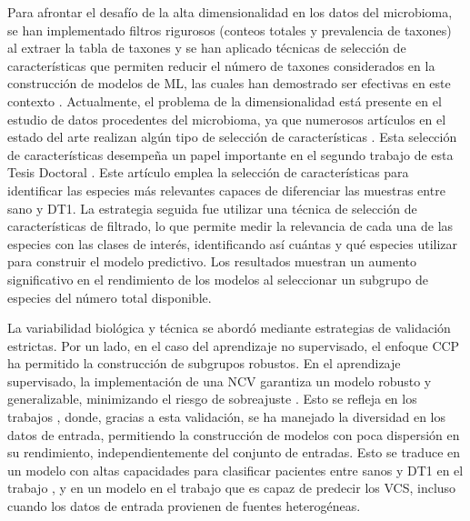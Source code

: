 Para afrontar el desafío de la alta dimensionalidad en los datos del microbioma, se han implementado filtros rigurosos (conteos totales y prevalencia de taxones) al extraer la tabla de taxones y se han aplicado técnicas de selección de características que permiten reducir el número de taxones considerados en la construcción de modelos de ML, las cuales han demostrado ser efectivas en este contexto \cite{segata2011metagenomic}. Actualmente, el problema de la dimensionalidad está presente en el estudio de datos procedentes del microbioma, ya que numerosos artículos en el estado del arte realizan algún tipo de selección de características \cite{beck2015machine, biassoni2020gut, bakir2021discovering, bakir2022inflammatory, chavarria2025using}. Esta selección de características desempeña un papel importante en el segundo trabajo de esta Tesis Doctoral \cite{paper2}. Este artículo emplea la selección de características para identificar las especies más relevantes capaces de diferenciar las muestras entre sano y DT1. La estrategia seguida fue utilizar una técnica de selección de características de filtrado, lo que permite medir la relevancia de cada una de las especies con las clases de interés, identificando así cuántas y qué especies utilizar para construir el modelo predictivo. Los resultados muestran un aumento significativo en el rendimiento de los modelos al seleccionar un subgrupo de especies del número total disponible.


La variabilidad biológica y técnica se abordó mediante estrategias de validación estrictas. Por un lado, en el caso del aprendizaje no supervisado, el enfoque CCP ha permitido la construcción de subgrupos robustos. En el aprendizaje supervisado, la implementación de una NCV garantiza un modelo robusto y generalizable, minimizando el riesgo de sobreajuste \cite{varma2006bias}. Esto se refleja en los trabajos \cite{paper2, paper3}, donde, gracias a esta validación, se ha manejado la diversidad en los datos de entrada, permitiendo la construcción de modelos con poca dispersión en su rendimiento, independientemente del conjunto de entradas. Esto se traduce en un modelo con altas capacidades para clasificar pacientes entre sanos y DT1 en el trabajo \cite{paper2}, y en un modelo en el trabajo \cite{paper3} que es capaz de predecir los VCS, incluso cuando los datos de entrada provienen de fuentes heterogéneas.

